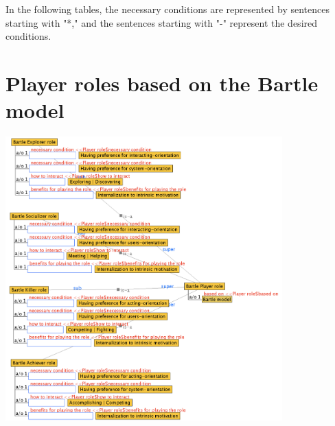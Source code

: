 

 In the following tables, the necessary conditions are represented by sentences starting with "*," and the sentences starting with "-" represent the desired conditions.

\section{Player roles based on the Bartle model}
\label{sec:player-roles-based-bartle}

\includegraphics[width=0.8\textwidth]{images/appendix/player-roles-based-bartle.png}

